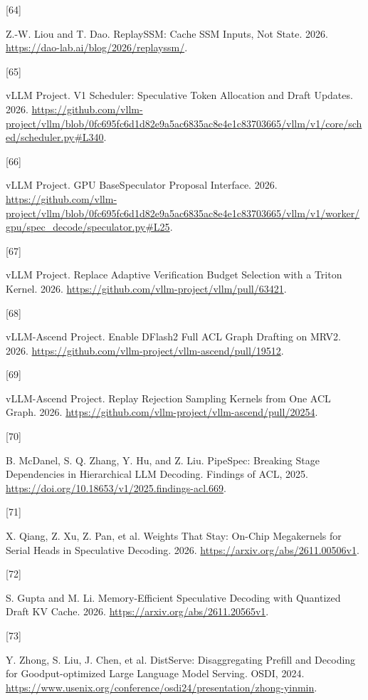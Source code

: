 \documentclass[
  a4paper,
  UTF8,
  fontset=none,
  zihao=5]{ctexart}
\newlength{\cslhangindent}
\newlength{\csllabelwidth}
\newenvironment{CSLReferences}[2] %
 {\begin{list}{}{%
  \setlength{\itemindent}{0pt}
  \setlength{\leftmargin}{0pt}
  \setlength{\parsep}{0pt}
  \ifodd #1
   \setlength{\leftmargin}{\cslhangindent}
   \setlength{\itemindent}{-1\cslhangindent}
  \fi
  \setlength{\itemsep}{#2\baselineskip}}}
 {\end{list}}
\newcommand{\CSLLeftMargin}[1]{\parbox[t]{\csllabelwidth}{\strut#1\strut}}
\newcommand{\CSLRightInline}[1]{\parbox[t]{\linewidth - \csllabelwidth}{\strut#1\strut}}
\begin{document}
\begin{CSLReferences}{0}{0}
\CSLLeftMargin{{[}64{]} }%
\CSLRightInline{Z.-W. Liou and T. Dao. {ReplaySSM: Cache SSM Inputs, Not
State}. 2026. \url{https://dao-lab.ai/blog/2026/replayssm/}.}

\CSLLeftMargin{{[}65{]} }%
\CSLRightInline{vLLM Project. {V1 Scheduler: Speculative Token
Allocation and Draft Updates}. 2026.
\url{https://github.com/vllm-project/vllm/blob/0fc695fc6d1d82e9a5ac6835ac8e4e1c83703665/vllm/v1/core/sched/scheduler.py\#L340}.}

\CSLLeftMargin{{[}66{]} }%
\CSLRightInline{vLLM Project. {GPU BaseSpeculator Proposal Interface}.
2026.
\url{https://github.com/vllm-project/vllm/blob/0fc695fc6d1d82e9a5ac6835ac8e4e1c83703665/vllm/v1/worker/gpu/spec_decode/speculator.py\#L25}.}

\CSLLeftMargin{{[}67{]} }%
\CSLRightInline{vLLM Project. {Replace Adaptive Verification Budget
Selection with a Triton Kernel}. 2026.
\url{https://github.com/vllm-project/vllm/pull/63421}.}

\CSLLeftMargin{{[}68{]} }%
\CSLRightInline{vLLM-Ascend Project. {Enable DFlash2 Full ACL Graph
Drafting on MRV2}. 2026.
\url{https://github.com/vllm-project/vllm-ascend/pull/19512}.}

\CSLLeftMargin{{[}69{]} }%
\CSLRightInline{vLLM-Ascend Project. {Replay Rejection Sampling Kernels
from One ACL Graph}. 2026.
\url{https://github.com/vllm-project/vllm-ascend/pull/20254}.}

\CSLLeftMargin{{[}70{]} }%
\CSLRightInline{B. McDanel, S. Q. Zhang, Y. Hu, and Z. Liu. {PipeSpec:
Breaking Stage Dependencies in Hierarchical LLM Decoding}. Findings of
ACL, 2025. \url{https://doi.org/10.18653/v1/2025.findings-acl.669}.}

\CSLLeftMargin{{[}71{]} }%
\CSLRightInline{X. Qiang, Z. Xu, Z. Pan, et al. {Weights That Stay:
On-Chip Megakernels for Serial Heads in Speculative Decoding}. 2026.
\url{https://arxiv.org/abs/2611.00506v1}.}

\CSLLeftMargin{{[}72{]} }%
\CSLRightInline{S. Gupta and M. Li. {Memory-Efficient Speculative
Decoding with Quantized Draft KV Cache}. 2026.
\url{https://arxiv.org/abs/2611.20565v1}.}

\CSLLeftMargin{{[}73{]} }%
\CSLRightInline{Y. Zhong, S. Liu, J. Chen, et al. {DistServe:
Disaggregating Prefill and Decoding for Goodput-optimized Large Language
Model Serving}. OSDI, 2024.
\url{https://www.usenix.org/conference/osdi24/presentation/zhong-yinmin}.}


\end{CSLReferences}
\end{document}
